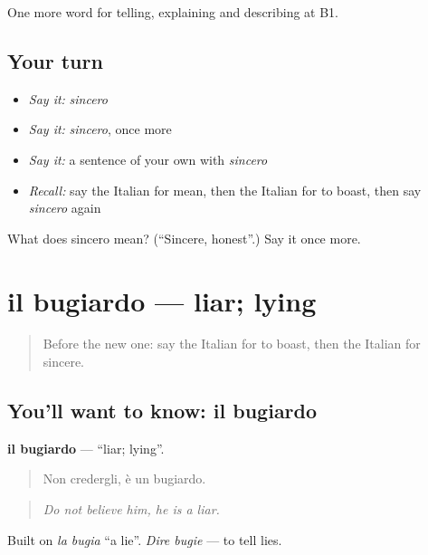 \begin{grammarlens}[title={What you've built}]
One more word for telling, explaining and describing at B1.
\end{grammarlens}

\subsection*{Your turn}
\begin{itemize}
\raggedright
  \item \emph{Say it:} \emph{sincero}
  \item \emph{Say it:} \emph{sincero}, once more
  \item \emph{Say it:} a sentence of your own with \emph{sincero}
  \item \emph{Recall:} say the Italian for mean, then the Italian for to boast, then say \emph{sincero} again
\end{itemize}

\begin{tcolorbox}[breakable,colback=teal!4,colframe=teal!35!black,title={Before you move on}]
What does sincero mean? (\textquotedblleft{}Sincere, honest\textquotedblright{}.) Say it once more.
\end{tcolorbox}
\section[il bugiardo]{il bugiardo — liar; lying}

\label{lesson:IT-C473-bugiardo}



\begin{quote}
Before the new one: say the Italian for to boast, then the Italian for sincere.
\end{quote}

\subsection*{You'll want to know: il bugiardo}
\textbf{il bugiardo} — \textquotedblleft{}liar; lying\textquotedblright{}.

\begin{quote}
Non credergli, è un bugiardo.
\end{quote}

\begin{quote}
\emph{Do not believe him, he is a liar.}
\end{quote}

Built on \emph{la bugia} \textquotedblleft{}a lie\textquotedblright{}. \emph{Dire bugie} — to tell lies.


